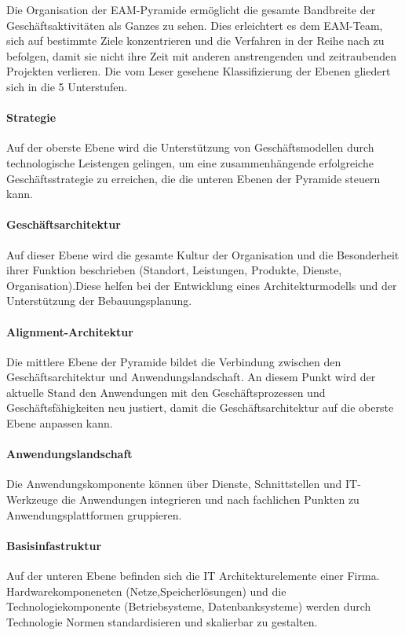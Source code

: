 \documentclass[
	doc,
	a4paper,
	helv
	]{apa6}
\begin{document}
Die Organisation der EAM-Pyramide ermöglicht die gesamte Bandbreite der Geschäftsaktivitäten als Ganzes zu sehen. Dies erleichtert es dem EAM-Team, sich auf bestimmte Ziele konzentrieren und die Verfahren in der Reihe nach zu befolgen, damit sie nicht ihre Zeit mit anderen anstrengenden und zeitraubenden Projekten verlieren. Die vom Leser gesehene Klassifizierung der Ebenen gliedert sich in die 5 Unterstufen.

\paragraph{Strategie}
Auf der oberste Ebene wird die Unterstützung von Geschäftsmodellen durch technologische Leistengen gelingen, um eine zusammenhängende erfolgreiche Geschäftsstrategie zu erreichen, die die unteren Ebenen der Pyramide steuern kann.
\paragraph{Geschäftsarchitektur}
Auf dieser Ebene wird die gesamte Kultur der Organisation und die Besonderheit ihrer Funktion beschrieben (Standort, Leistungen, Produkte, Dienste, Organisation).Diese helfen bei der Entwicklung eines Architekturmodells und der Unterstützung der Bebauungsplanung.
\paragraph{Alignment-Architektur}
Die mittlere Ebene der Pyramide bildet die Verbindung zwischen den Geschäftsarchitektur und Anwendungslandschaft. An diesem Punkt wird der aktuelle Stand den Anwendungen mit den Geschäftsprozessen und Geschäftsfähigkeiten  neu justiert, damit die Geschäftsarchitektur auf die oberste Ebene anpassen kann.
\paragraph{Anwendungslandschaft}
Die Anwendungskomponente können über Dienste, Schnittstellen und IT-Werkzeuge die Anwendungen integrieren und nach fachlichen Punkten zu Anwendungsplattformen gruppieren.
\paragraph{Basisinfastruktur}
Auf der unteren Ebene befinden sich die IT Architekturelemente einer Firma. Hardwarekomponeneten (Netze,Speicherlösungen) und die Technologiekomponente (Betriebsysteme, Datenbanksysteme) werden durch Technologie Normen standardisieren und skalierbar zu gestalten.
\end{document}
